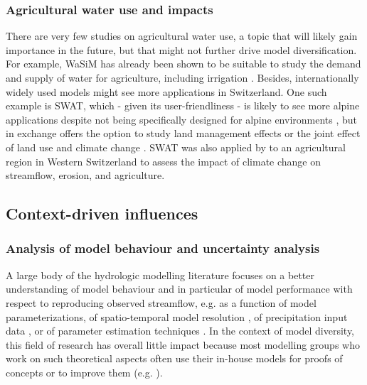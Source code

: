 \documentclass[10pt,a4paper]{article}
\begin{document}
\subsubsection{Agricultural water use and impacts}
\label{sec:application:agriculture}

There are very few studies on agricultural water use, a topic that will likely gain importance in the future, but that might not further drive model diversification. For example, WaSiM has already been shown to be suitable to study the demand and supply of water for agriculture, including irrigation \citep{Fuhrer2012}. Besides, internationally widely used models might see more applications in Switzerland. One such example is SWAT, which - given its user-friendliness \citep{Abbaspour2007} - is likely to see more alpine applications despite not being specifically designed for alpine environments \citep{Rahman2014, Andrianaki2019}, but in exchange offers the option to study land management effects \citep{Zarrineh2018} or the joint effect of land use and climate change \citep{Rahman2015}. SWAT was also applied by \citet{Zarrineh2020} to an agricultural region in Western Switzerland to assess the impact of climate change on streamflow, erosion, and agriculture.


\subsection{Context-driven influences}
\label{sec:application:context}


\subsubsection{Analysis of model behaviour and uncertainty analysis}
\label{sec:application:uncertainty}

A large body of the hydrologic modelling literature focuses on a better understanding of model behaviour and in particular of model performance with respect to reproducing observed streamflow, e.g. as a function of model parameterizations, of spatio-temporal model resolution \citep{Brunner2019}, of precipitation input data \citep{Sikorska2016, Sikorska2017, Muller-Thomy2019}, or of parameter estimation techniques \citep{Foglia2009, Cullmann2011}. In the context of model diversity, this field of research has overall little impact because most modelling groups who work on such theoretical aspects often use their in-house models for proofs of concepts or to improve them (e.g. \citealt{Schaefli2007, Hingray2010}).
\end{document}
